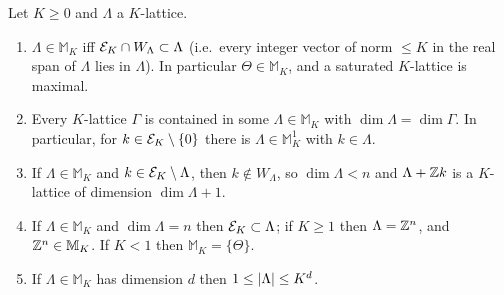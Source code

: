\begin{lemma}\label{bpN:p8:maximal}
Let $K\ge0$ and $\Lambda$ a $K$-lattice.
\begin{enumerate}[label=(\alph*)]
\item $\Lambda\in\mathbb M_K$ iff $\mathcal E_K\cap W_\Lambda\subset\Lambda$ (i.e.\ every integer vector of norm $\le K$ in the real span of $\Lambda$ lies in $\Lambda$). In particular $\Theta\in\mathbb M_K$, and a saturated $K$-lattice is maximal.
\item Every $K$-lattice $\Gamma$ is contained in some $\Lambda\in\mathbb M_K$ with $\dim\Lambda=\dim\Gamma$. In particular, for $k\in\mathcal E_K\setminus\{0\}$ there is $\Lambda\in\mathbb M_K^1$ with $k\in\Lambda$.
\item If $\Lambda\in\mathbb M_K$ and $k\in\mathcal E_K\setminus\Lambda$, then $k\notin W_\Lambda$, so $\dim\Lambda<n$ and $\Lambda+\mathbb{Z} k$ is a $K$-lattice of dimension $\dim\Lambda+1$.
\item If $\Lambda\in\mathbb M_K$ and $\dim\Lambda=n$ then $\mathcal E_K\subset\Lambda$; if $K\ge1$ then $\Lambda=\mathbb{Z}^n$, and $\mathbb{Z}^n\in\mathbb M_K$. If $K<1$ then $\mathbb M_K=\{\Theta\}$.
\item If $\Lambda\in\mathbb M_K$ has dimension $d$ then $1\le\lvert \Lambda\rvert\le K^d$.
\end{enumerate}
\end{lemma}
